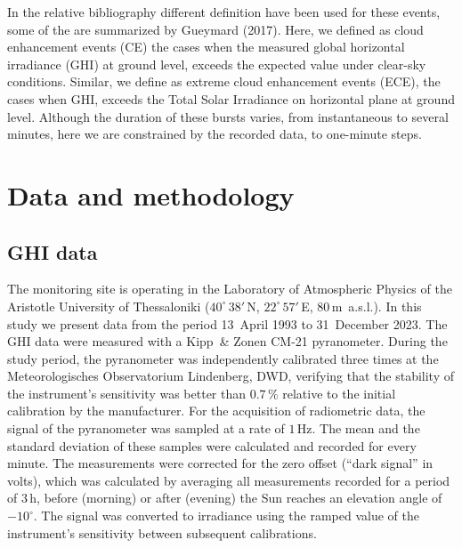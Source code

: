 \documentclass[
]{article}
\begin{document}
In the relative bibliography different definition have been used for these events,
some of the are summarized by Gueymard (2017). Here, we defined as cloud enhancement
events (CE) the cases when the measured global horizontal irradiance (GHI) at ground
level, exceeds the expected value under clear-sky conditions. Similar, we define as
extreme cloud enhancement events (ECE), the cases when GHI, exceeds the Total Solar
Irradiance on horizontal plane at ground level. Although the duration of these
bursts varies, from instantaneous to several minutes, here we are constrained by the
recorded data, to one-minute steps.

\hypertarget{data-and-methodology}{%
\section{Data and methodology}\label{data-and-methodology}}

\hypertarget{ghi-data}{%
\subsection{GHI data}\label{ghi-data}}

The monitoring site is operating in the Laboratory of Atmospheric Physics of the
Aristotle University of Thessaloniki (\(40^\circ\,38'\,\)N,
\(22^\circ\,57'\,\)E, \(80\,\)m~a.s.l.).
In this study we present data from the period
13~April 1993 to
31~December 2023.
The GHI data were measured with a Kipp~\& Zonen CM-21 pyranometer. During the study
period, the pyranometer was independently calibrated three times at the
Meteorologisches Observatorium Lindenberg, DWD, verifying that the stability of the
instrument's sensitivity was better than \(0.7\,\%\) relative to the initial
calibration by the manufacturer.
For the acquisition of radiometric data, the signal of the pyranometer was sampled at
a rate of \(1\,\text{Hz}\). The mean and the standard deviation of these samples were
calculated and recorded for every minute. The measurements were corrected for the
zero offset (``dark signal'' in volts), which was calculated by averaging all
measurements recorded for a period of \(3\,\text{h}\), before (morning) or after
(evening) the Sun reaches an elevation angle of \(-10^\circ\). The signal was
converted to irradiance using the ramped value of the instrument's sensitivity
between subsequent calibrations.
\end{document}
